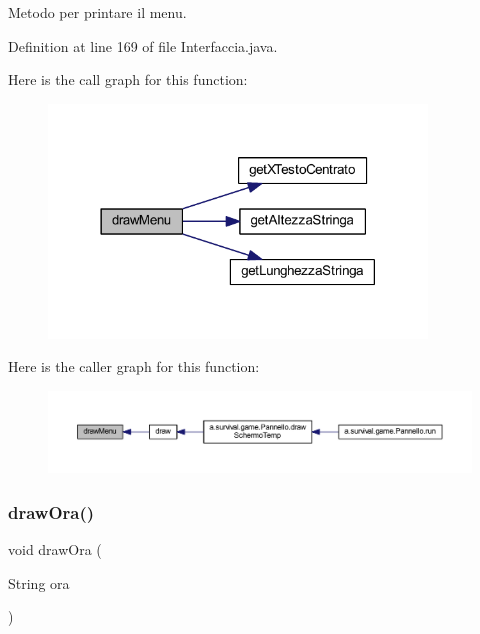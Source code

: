Metodo per printare il menu. 



Definition at line 169 of file Interfaccia.\+java.

Here is the call graph for this function\+:
\nopagebreak
\begin{figure}[H]
\begin{center}
\leavevmode
\includegraphics[width=285pt]{classa_1_1survival_1_1game_1_1_interfaccia_aa13653318c21b0e6b86838e6091bfc9a_cgraph}
\end{center}
\end{figure}
Here is the caller graph for this function\+:
\nopagebreak
\begin{figure}[H]
\begin{center}
\leavevmode
\includegraphics[width=350pt]{classa_1_1survival_1_1game_1_1_interfaccia_aa13653318c21b0e6b86838e6091bfc9a_icgraph}
\end{center}
\end{figure}
\mbox{\label{classa_1_1survival_1_1game_1_1_interfaccia_a2dc05af87e20aefac5da3cd184d09456}} 
\subsubsection{\texorpdfstring{draw\+Ora()}{drawOra()}}
{\footnotesize\ttfamily void draw\+Ora (\begin{DoxyParamCaption}\item[{String}]{ora }\end{DoxyParamCaption})}



